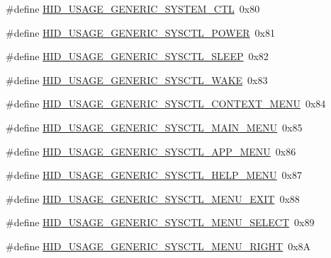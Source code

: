 \begin{DoxyCompactItemize}
\item 
\#define \hyperlink{group___u_s_b_d___h_i_d_gad4265a946721f748c8d8afdddeadec45}{H\+I\+D\+\_\+\+U\+S\+A\+G\+E\+\_\+\+G\+E\+N\+E\+R\+I\+C\+\_\+\+S\+Y\+S\+T\+E\+M\+\_\+\+C\+TL}~0x80
\item 
\#define \hyperlink{group___u_s_b_d___h_i_d_gaa12436658efedf9123a66b4b8e56475a}{H\+I\+D\+\_\+\+U\+S\+A\+G\+E\+\_\+\+G\+E\+N\+E\+R\+I\+C\+\_\+\+S\+Y\+S\+C\+T\+L\+\_\+\+P\+O\+W\+ER}~0x81
\item 
\#define \hyperlink{group___u_s_b_d___h_i_d_gac73b2f6e789c3befc8a9acd70dcddee5}{H\+I\+D\+\_\+\+U\+S\+A\+G\+E\+\_\+\+G\+E\+N\+E\+R\+I\+C\+\_\+\+S\+Y\+S\+C\+T\+L\+\_\+\+S\+L\+E\+EP}~0x82
\item 
\#define \hyperlink{group___u_s_b_d___h_i_d_ga638c72786880aa6c6af98e5bc45fe647}{H\+I\+D\+\_\+\+U\+S\+A\+G\+E\+\_\+\+G\+E\+N\+E\+R\+I\+C\+\_\+\+S\+Y\+S\+C\+T\+L\+\_\+\+W\+A\+KE}~0x83
\item 
\#define \hyperlink{group___u_s_b_d___h_i_d_gaecbdbbdeb5d258f1e3a825422befb662}{H\+I\+D\+\_\+\+U\+S\+A\+G\+E\+\_\+\+G\+E\+N\+E\+R\+I\+C\+\_\+\+S\+Y\+S\+C\+T\+L\+\_\+\+C\+O\+N\+T\+E\+X\+T\+\_\+\+M\+E\+NU}~0x84
\item 
\#define \hyperlink{group___u_s_b_d___h_i_d_gae2a1d26ba209e92cc8ce2865ef64dcdf}{H\+I\+D\+\_\+\+U\+S\+A\+G\+E\+\_\+\+G\+E\+N\+E\+R\+I\+C\+\_\+\+S\+Y\+S\+C\+T\+L\+\_\+\+M\+A\+I\+N\+\_\+\+M\+E\+NU}~0x85
\item 
\#define \hyperlink{group___u_s_b_d___h_i_d_gaa73cbfdc8f380dcc3adda776b137bdf4}{H\+I\+D\+\_\+\+U\+S\+A\+G\+E\+\_\+\+G\+E\+N\+E\+R\+I\+C\+\_\+\+S\+Y\+S\+C\+T\+L\+\_\+\+A\+P\+P\+\_\+\+M\+E\+NU}~0x86
\item 
\#define \hyperlink{group___u_s_b_d___h_i_d_gaa945bc70860e9c983e658077d494753b}{H\+I\+D\+\_\+\+U\+S\+A\+G\+E\+\_\+\+G\+E\+N\+E\+R\+I\+C\+\_\+\+S\+Y\+S\+C\+T\+L\+\_\+\+H\+E\+L\+P\+\_\+\+M\+E\+NU}~0x87
\item 
\#define \hyperlink{group___u_s_b_d___h_i_d_gafc91a635055259c0d3a483d6c589c3be}{H\+I\+D\+\_\+\+U\+S\+A\+G\+E\+\_\+\+G\+E\+N\+E\+R\+I\+C\+\_\+\+S\+Y\+S\+C\+T\+L\+\_\+\+M\+E\+N\+U\+\_\+\+E\+X\+IT}~0x88
\item 
\#define \hyperlink{group___u_s_b_d___h_i_d_gab64d10fd6ec3ea549ed4050169f93a4f}{H\+I\+D\+\_\+\+U\+S\+A\+G\+E\+\_\+\+G\+E\+N\+E\+R\+I\+C\+\_\+\+S\+Y\+S\+C\+T\+L\+\_\+\+M\+E\+N\+U\+\_\+\+S\+E\+L\+E\+CT}~0x89
\item 
\#define \hyperlink{group___u_s_b_d___h_i_d_gac7f621deee3092ef3c2dd86dbb7b0ea8}{H\+I\+D\+\_\+\+U\+S\+A\+G\+E\+\_\+\+G\+E\+N\+E\+R\+I\+C\+\_\+\+S\+Y\+S\+C\+T\+L\+\_\+\+M\+E\+N\+U\+\_\+\+R\+I\+G\+HT}~0x8A

\end{DoxyCompactItemize}
